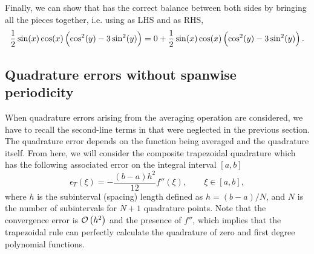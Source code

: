 \documentclass[../main.tex]{subfiles}
\begin{document}
Finally, we can show that  has the correct balance between both sides by bringing all the pieces together, i.e. using  as LHS and  as RHS,
\begin{equation}
\frac{1}{2} \sin(x) \cos(x) \left(\cos^2(y)-3\sin^2(y) \right) = 0 + \frac{1}{2} \sin(x) \cos(x) \left(\cos^2(y)-3\sin^2(y) \right).
\end{equation}

\subsection{Quadrature errors without spanwise periodicity}
\label{sec:sans_quadrature_errors1}

When quadrature errors arising from the averaging operation are considered, we have to recall the second-line terms in  that were neglected in the previous section.
The quadrature error depends on the function being averaged and the quadrature itself.
From here, we will consider the composite trapezoidal quadrature which has the following associated error on the integral interval $[a,b]$
\begin{equation}
\epsilon_T(\xi) = -\frac{(b-a)h^2}{12} f''(\xi), \qquad \xi \in [a,b],
\end{equation}
where $h$ is the subinterval (spacing) length defined as $h=(b-a)/N$, and $N$ is the number of subintervals for $N+1$ quadrature points.
Note that the convergence error is $\mathcal{O}\left(h^2 \right)$ and the presence of $f''$, which implies that the trapezoidal rule can perfectly calculate the quadrature of zero and first degree polynomial functions.
\end{document}
